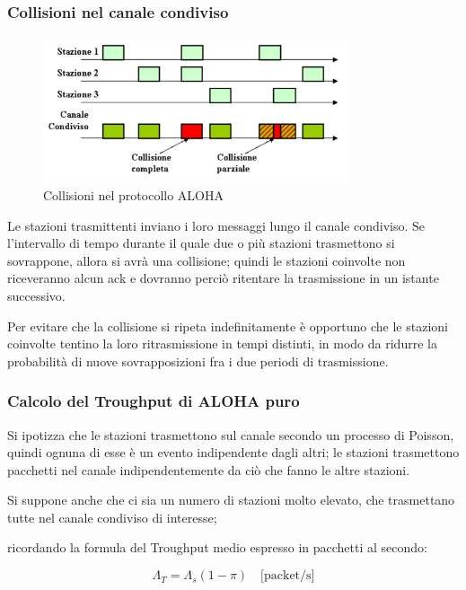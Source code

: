 \subsubsection{Collisioni nel canale condiviso}
\begin{figure}[htbp]
    \centering
    \includegraphics[width=0.8\textwidth]{images/alohacollisioni.png}
    \caption{Collisioni nel protocollo ALOHA}
    \label{fig:aloha-collisioni}
\end{figure}

Le stazioni trasmittenti inviano i loro messaggi lungo il canale condiviso. Se l'intervallo di tempo durante il quale due o più stazioni trasmettono si sovrappone, allora si avrà una collisione; quindi le stazioni coinvolte non riceveranno alcun ack e dovranno perciò ritentare la trasmissione in un istante successivo. 

Per evitare che la collisione si ripeta indefinitamente è opportuno che le stazioni coinvolte tentino la loro ritrasmissione in tempi distinti, in modo da ridurre la probabilità di nuove sovrapposizioni fra i due periodi di trasmissione.

\newpage
\subsubsection{Calcolo del Troughput di ALOHA puro}
Si ipotizza che le stazioni trasmettono sul canale secondo un processo di Poisson, quindi ognuna di esse è un evento indipendente dagli altri; le stazioni trasmettono pacchetti nel canale indipendentemente da ciò che fanno le altre stazioni.

Si suppone anche che ci sia un numero di stazioni molto elevato, che trasmettano tutte nel canale condiviso di interesse; 

ricordando la formula del Troughput medio espresso in pacchetti al secondo: 

\begin{equation}
    \Lambda_T = \Lambda_s (1 - \pi) \quad \text{[packet/s]}
\end{equation}


